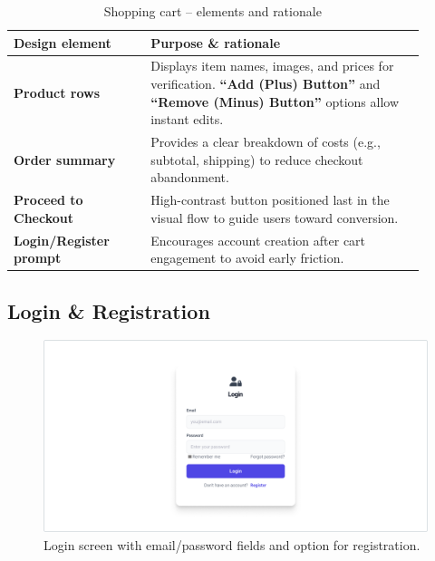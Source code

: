 \documentclass[12pt]{article}
\begin{document}
	\begin{table}[H]
		\centering
		\caption{Shopping cart – elements and rationale}
		\label{tab:cart-elements}

		\begin{tabular}{p{0.30\linewidth} p{0.60\linewidth}}
        	\toprule
        	\textbf{Design element} & \textbf{Purpose \& rationale} \\ \midrule
				\textbf{Product rows}            & Displays item names, images, and prices for verification.
												 \textbf{``Add (Plus) Button''} and \textbf{``Remove (Minus) Button''} options allow instant edits. \\
				\textbf{Order summary}           & Provides a clear breakdown of costs (e.g., subtotal, shipping) to reduce checkout abandonment. \\
				\textbf{Proceed to Checkout}     & High-contrast button positioned last in the visual flow to guide users toward conversion. \\
				\textbf{Login/Register prompt}   & Encourages account creation after cart engagement to avoid early friction. \\
        	\bottomrule
    	\end{tabular}

	\end{table}



	\subsection{Login \& Registration}\label{subsec:login-register}

	\begin{figure}[H]
		\centering
		\includegraphics[width=1.0\linewidth]{pictures/main/LoginPage_Figma}%
		\caption{Login screen with email/password fields and option for registration.}
		\label{fig:ui-login}
	\end{figure}
\end{document}
